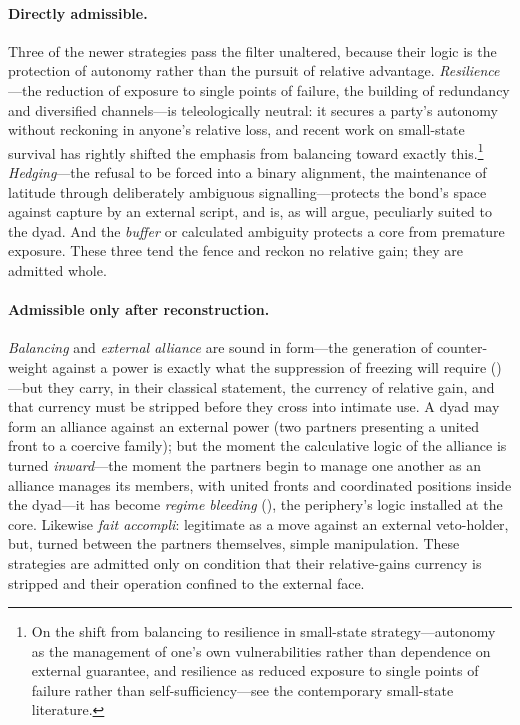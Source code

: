 \paragraph{Directly admissible.} Three of the newer strategies pass the filter unaltered, because their logic is the protection of autonomy rather than the pursuit of relative advantage. \emph{Resilience}---the reduction of exposure to single points of failure, the building of redundancy and diversified channels---is teleologically neutral: it secures a party's autonomy without reckoning in anyone's relative loss, and recent work on small-state survival has rightly shifted the emphasis from balancing toward exactly this.\footnote{On the shift from balancing to resilience in small-state strategy---autonomy as the management of one's own vulnerabilities rather than dependence on external guarantee, and resilience as reduced exposure to single points of failure rather than self-sufficiency---see the contemporary small-state literature.} \emph{Hedging}---the refusal to be forced into a binary alignment, the maintenance of latitude through deliberately ambiguous signalling---protects the bond's space against capture by an external script, and is, as  will argue, peculiarly suited to the dyad. And the \emph{buffer} or calculated ambiguity protects a core from premature exposure. These three tend the fence and reckon no relative gain; they are admitted whole.

\paragraph{Admissible only after reconstruction.} \emph{Balancing} and \emph{external alliance} are sound in form---the generation of counter-weight against a power is exactly what the suppression of freezing will require ()---but they carry, in their classical statement, the currency of relative gain, and that currency must be stripped before they cross into intimate use. A dyad may form an alliance against an external power (two partners presenting a united front to a coercive family); but the moment the calculative logic of the alliance is turned \emph{inward}---the moment the partners begin to manage one another as an alliance manages its members, with united fronts and coordinated positions inside the dyad---it has become \emph{regime bleeding} (), the periphery's logic installed at the core. Likewise \emph{fait accompli}: legitimate as a move against an external veto-holder, but, turned between the partners themselves, simple manipulation. These strategies are admitted only on condition that their relative-gains currency is stripped and their operation confined to the external face.

